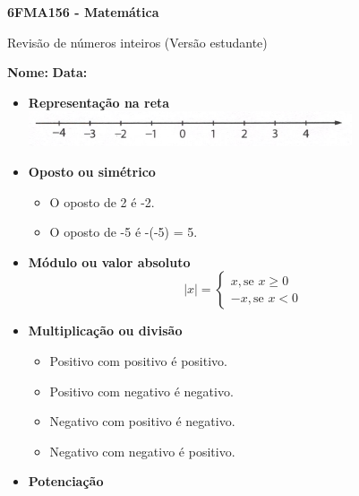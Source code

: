 \documentclass[a4paper,14pt]{article}
\begin{document}
	
	\noindent\textbf{6FMA156 - Matemática} 
	
	\begin{center}Revisão de números inteiros (Versão estudante)
	\end{center}
	
	\noindent\textbf{Nome:} \underline{\hspace{10cm}}
	\noindent\textbf{Data:} \underline{\hspace{4cm}}
	
	
	\begin{multicols}{2}
	    \noindent \begin{itemize}
	    	\item \textbf{Representação na reta} \\
	    	\includegraphics[width=1\linewidth]{6FMA156_imagens/imagem1}
	    	\item \textbf{Oposto ou simétrico}
	    	\begin{itemize}[label=\scriptsize$\blacksquare$]
	    		\item O oposto de 2 é -2.
	    		\item O oposto de -5 é -(-5) = 5.
	    	\end{itemize}
	    	\item \textbf{Módulo ou valor absoluto}
	    	\[|x| = 
	    	\begin{cases} 
	    		x, \text{se } x \geq 0 \\ 
	    		-x, \text{se } x < 0 
	    	\end{cases}\]
	    	\item \textbf{Multiplicação ou divisão}
	    	\begin{itemize}[label=\scriptsize$\blacksquare$]
	    		\item Positivo com positivo é positivo.
	    		\item Positivo com negativo é negativo.
	    		\item Negativo com positivo é negativo.
	    		\item Negativo com negativo é positivo.
	    	\end{itemize}
	    	\item \textbf{Potenciação}

\end{itemize}
\end{multicols}
\end{document}
